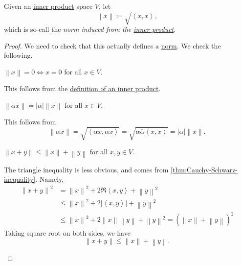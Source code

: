 \begin{definition}\label{def:induced-norm-from-inner-product}
	Given an \hyperref[def:inner-product]{inner product} space \(V\), let
	\[
		\left\lVert x\right\rVert \coloneqq \sqrt{\left< x,x \right>},
	\]
	which is so-call the \emph{norm induced from the \hyperref[def:inner-product]{inner product}}.
\end{definition}
\begin{proof}
	We need to check that this actually defines a \hyperref[def:norm]{norm}. We check the following.
	\begin{claim}
		\(\left\lVert x\right\rVert = 0 \iff x = 0\) for all \(x\in V\).
	\end{claim}
	\begin{explanation}
		This follows from the \hyperref[def:inner-product]{definition of an inner product}.
	\end{explanation}

	\begin{claim}
		\(\left\lVert \alpha x\right\rVert = \left\vert \alpha \right\vert \left\lVert x\right\rVert \) for all \(x\in V\).
	\end{claim}
	\begin{explanation}
		This follows from
		\[
			\left\lVert \alpha x\right\rVert = \sqrt{\left< \alpha x, \alpha x \right> } = \sqrt{\alpha \overline{\alpha}\left< x,x \right> }  = \left\vert \alpha \right\vert \left\lVert x\right\rVert.
		\]
	\end{explanation}

	\begin{claim}
		\(\left\lVert x+y\right\rVert \leq \left\lVert x\right\rVert + \left\lVert y\right\rVert \) for all \(x, y\in V\).
	\end{claim}
	\begin{explanation}
		The triangle inequality is less obvious, and comes from \autoref{thm:Cauchy-Schwarz-inequality}. Namely,
		\[
			\begin{split}
				\left\lVert x + y\right\rVert^2
				&= \left\lVert x\right\rVert^2 + 2\Re\left< x,y \right> + \left\lVert y\right\rVert^2 \\
				&\leq \left\lVert x\right\rVert^2 + 2\left\vert \left< x,y \right> \right\vert + \left\lVert y\right\rVert^2 \\
				&\leq \left\lVert x\right\rVert^2 + 2\left\lVert x\right\rVert \left\lVert y\right\rVert + \left\lVert y\right\rVert^2
				= (\left\lVert x\right\rVert + \left\lVert y\right\rVert)^2
			\end{split}
		\]
		Taking square root on both sides, we have
		\[
			\left\lVert x + y\right\rVert \leq \left\lVert x\right\rVert + \left\lVert y\right\rVert.
		\]
	\end{explanation}
\end{proof}

